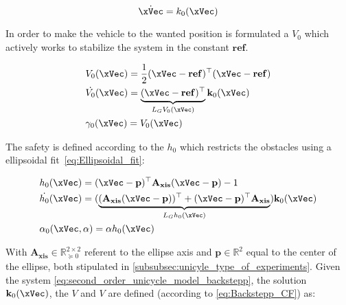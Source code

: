 \begin{equation}
    \dot{\xVec} = k_0(\xVec) 
    \label{eq:first_order_unicycle_model_backstepp}
\end{equation}

In order to make the vehicle to the wanted position is formulated a  \(V_0\) which actively works to stabilize the system in the constant \(\mathbf{ref}\).

\begin{subequations}
   \begin{align}
    &V_0(\xVec) = \frac{1}{2}(\xVec-\mathbf{ref})^{\top}(\xVec-\mathbf{ref}) \label{eq:V0_unicycle} \\
    &\dot{V_0}(\xVec) = \underbrace{(\xVec-\mathbf{ref})^{\top}}_{L_GV_0(\xVec)}\mathbf{k}_0(\xVec)  \label{eq:dot_V0_unicycle} \\
    &\gamma_0(\xVec)  = V_0(\xVec) \label{eq:CLF_gamma0_unicycle}
\end{align}
\label{eq:CLF0_unicycle}
\end{subequations}


The safety is defined according to the  \(h_0\) which restricts the obstacles using a ellipsoidal fit~\ref{eq:Ellipsoidal_fit}:

\begin{subequations}
   \begin{align}
    &h_0(\xVec) = (\xVec-\mathbf{p})^{\top}\mathbf{A_{xis}}(\xVec-\mathbf{p}) - 1 \label{eq:h0_unicycle} \\
    &\dot{h_0}(\xVec) = (\underbrace{(\mathbf{A_{xis}}(\xVec-\mathbf{p}))^{\top} + (\xVec-\mathbf{p})^{\top}\mathbf{A_{xis}}}_{L_Gh_0(\xVec)})\mathbf{k}_0(\xVec)  \label{eq:dot_h0_unicycle} \\
    &\alpha_0(\xVec, \alpha)  = \alpha h_0(\xVec) \label{eq:CBF_alpha0_unicycle}
\end{align}
\label{eq:CBF0_unicycle}
\end{subequations}


With \(\mathbf{A_{xis}} \in \mathbb{R}^{2 \times 2}_{\succeq 0}\) referent to the ellipse axis and \(\mathbf{p} \in \mathbb{R}^2\) equal to the center of the ellipse, both stipulated in \ref{subsubsec:unicyle_type_of_experiments}. Given the system \ref{eq:second_order_unicycle_model_backstepp}, the solution \(\mathbf{k}_0(\xVec)\), the  \(V\) and  \(V\) are defined (according to \ref{eq:Backstepp_CF}) as:


